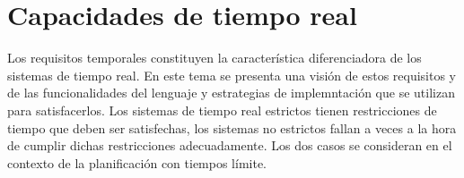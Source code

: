\section{Capacidades de tiempo real}

Los requisitos temporales constituyen la característica diferenciadora de los
sistemas de tiempo real. En este tema se presenta una visión de estos requisitos
y de las funcionalidades del lenguaje y estrategias de implemntación que se
utilizan para satisfacerlos. Los sistemas de tiempo real estrictos tienen
restricciones de tiempo que deben ser satisfechas, los sistemas no estrictos
fallan a veces a la hora de cumplir dichas restricciones adecuadamente. Los dos
casos se consideran en el contexto de la planificación con tiempos límite.
